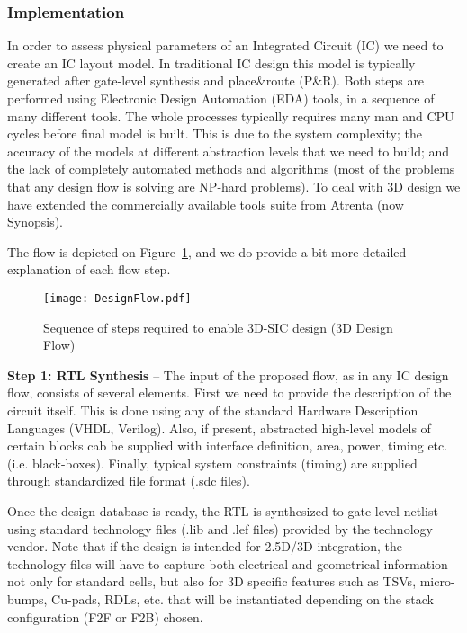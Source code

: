 \subsubsection*{Implementation}
In order to assess physical parameters of an Integrated Circuit (IC) we need to create an IC layout model. In traditional IC design this model is typically generated after gate-level synthesis and place\&route (P\&R). Both steps are performed using Electronic Design Automation (EDA) tools, in a sequence of many different tools. The whole processes typically requires many man and CPU cycles before final model is built. This is due to the system complexity; the accuracy of the models at different abstraction levels that we need to build; and the lack of completely automated methods and algorithms (most of the problems that any design flow is solving are NP-hard problems). To deal with 3D design we have extended the commercially available tools suite from Atrenta (now Synopsis).

The flow is depicted on Figure~\ref{fig:3DFlow}, and we do provide a bit more detailed explanation of each flow step.

\begin{figure}[!h]%
\centering
\texttt{[image: DesignFlow.pdf]}
\caption{Sequence of steps required to enable 3D-SIC design (3D Design Flow)\label{fig:3DFlow}}
\end{figure}

\textbf{Step 1: RTL Synthesis} – The input of the proposed flow, as in any IC design flow, consists of several elements. First we need to provide the description of the circuit itself. This is done using any of the standard Hardware Description Languages (VHDL, Verilog). Also, if present, abstracted high-level models of certain blocks cab be supplied with interface definition, area, power, timing etc. (i.e. black-boxes). Finally, typical system constraints (timing) are supplied through standardized file format (.sdc files).

Once the design database is ready, the RTL is synthesized to gate-level netlist using standard technology files (.lib and .lef files) provided by the technology vendor. Note that if the design is intended for 2.5D/3D integration, the technology files will have to capture both electrical and geometrical information not only for standard cells, but also for 3D specific features such as TSVs, micro-bumps, Cu-pads, RDLs, etc. that will be instantiated depending on the stack configuration (F2F or F2B) chosen.

